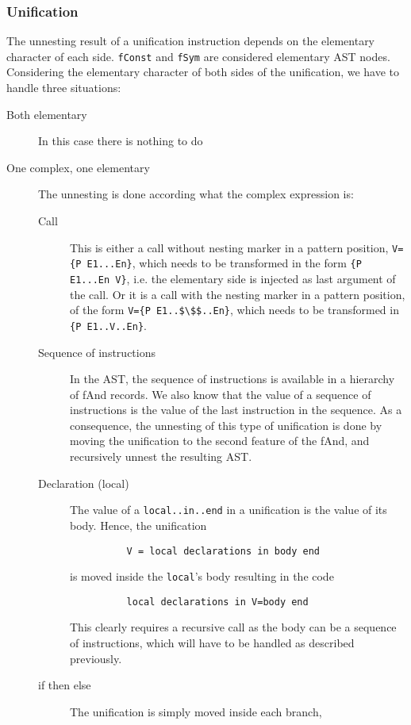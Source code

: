 \documentclass[a4paper]{memoir}
\begin{document}
\subsubsection{Unification}\label{sec:arch:unnester:unification}
The unnesting result of a unification instruction depends on the elementary
character of each side. \lstinline!fConst! and \lstinline!fSym! are considered elementary AST nodes.
Considering the elementary character of both sides of the unification, we have to handle three situations:
\begin{description}
  \item[Both elementary]In this case there is nothing to do
  \item[One complex, one elementary] The unnesting is done according what the
    complex expression is: 
    \begin{description}
      \item[Call] This is either a call without nesting marker in a pattern position, \lstinline!V={P E1...En}!,
        which needs to be transformed in the form \lstinline!{P E1...En V}!, i.e. the elementary side is injected as last argument of the call.
        Or it is a call with the nesting marker in a pattern position, of the form \lstinline[mathescape]!V={P E1..$\$$..En}!, which needs to be
        transformed in \lstinline!{P E1..V..En}!.
      \item[Sequence of instructions] In the AST, the sequence of instructions is available in a hierarchy of fAnd records. We also know that the value of a sequence of instructions is the value of the last instruction in the sequence. As a consequence, the unnesting of this type of unification is done by moving the unification to the second feature of the fAnd, and recursively unnest the resulting AST.
      \item[Declaration (local)] The value of a \lstinline!local..in..end! in a
        unification is the value of its body. Hence, the unification
        \begin{lstlisting}
          V = local declarations in body end
        \end{lstlisting}
        is moved inside the
        \lstinline!local!'s body resulting in the code 
        \begin{lstlisting}
          local declarations in V=body end
        \end{lstlisting}
        This clearly requires a recursive call as the body can be a sequence of instructions, which will have to be handled as described previously.
      \item[if then else] The unification is simply moved inside each branch,

\end{description}
\end{description}
\end{document}

